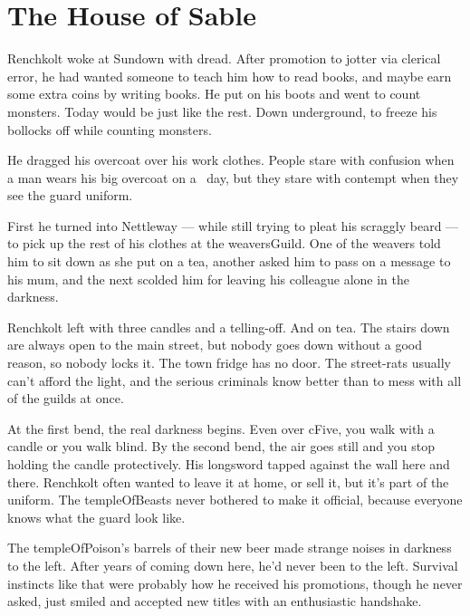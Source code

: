 \section{The House of Sable}


\begin{exampletext}
  Renchkolt woke at Sundown with dread.
  \ifcase\value{temperature}%
    After promotion to \gls{jotter} via clerical error, he had wanted someone to teach him how to read books, and maybe earn some extra coins by writing books.
    He put on his boots and went to count \glspl{monster}.
  \or%
    Today would be just like the rest.
    Down underground, to freeze his bollocks off while counting \glspl{monster}.

  \else%
    He dragged his overcoat over his work clothes.
    People stare with confusion when a man wears his big overcoat on a \showTemperature\ day, but they stare with contempt when they see the \gls{guard} uniform.
  \fi%

  First he turned into Nettleway --- while still trying to pleat his scraggly beard --- to pick up the rest of his clothes at the \gls{weaversGuild}.
  One of the \glspl{weaver} told him to sit down as she put on a tea, another asked him to pass on a message to his mum, and the next scolded him for leaving his colleague alone in the darkness.

  Renchkolt left with three candles and a telling-off.
  And on tea.
  The stairs down are always open to the main street, but nobody goes down without a good reason, so nobody locks it.
  The town fridge has no door.
  The street-rats usually can't afford the light, and the serious criminals know better than to mess with all of the \glspl{guild} at once.

  At the first bend, the real darkness begins.
  Even over \gls{cFive}, you walk with a candle or you walk blind.
  By the second bend, the air goes still and you stop holding the candle protectively.
  His longsword tapped against the wall here and there.
  Renchkolt often wanted to leave it at home, or sell it, but it's part of the uniform.
  The \gls{templeOfBeasts} never bothered to make it official, because everyone knows what the \gls{guard} look like.

  The \gls{templeOfPoison}'s barrels of their new beer made strange noises in darkness to the left.
  After years of coming down here, he'd never been to the left.
  Survival instincts like that were probably how he received his promotions, though he never asked, just smiled and accepted new titles with an enthusiastic handshake.


\end{exampletext}
